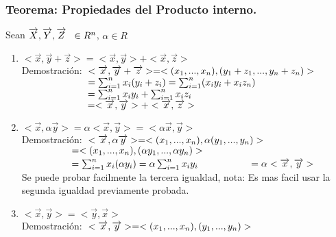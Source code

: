 \documentclass{book}
\begin{document}
\subsubsection*{Teorema: Propiedades del Producto interno.}
Sean $\overrightarrow{X},\overrightarrow{Y},\overrightarrow{Z}\hspace*{0.2cm}\in R^n$, $\alpha\in R$
\begin{enumerate}
    \item $<\overrightarrow{x},\overrightarrow{y}+\overrightarrow{z}>=<\overrightarrow{x},\overrightarrow{y}>+<\overrightarrow{x},\overrightarrow{z}>$
    \\Demostración:
    $\\<\overrightarrow{x},\overrightarrow{y}+\overrightarrow{z}>=<(x_{1},...,x_{n}),(y_{1}+z_{1},...,y_{n}+z_{n})>$
    $\\\hspace*{2.3cm}=\sum_{i=1}^{n}x_{i}(y_{i}+z_{i})=\sum_{i=1}^{n}(x_{i}y_{i}+x_{i}z_{n})$
    $\\\hspace*{2.3cm}=\sum_{i=1}^{n}x_{i}y_{i}+\sum_{i=1}^{n}x_{i}z_{i}$
    $\\\hspace*{2.3cm}=<\overrightarrow{x},\overrightarrow{y}>+<\overrightarrow{x},\overrightarrow{z}>$
    \item $<\overrightarrow{x},\alpha\overrightarrow{y}>=\alpha<\overrightarrow{x},\overrightarrow{y}>=<\alpha\overrightarrow{x},\overrightarrow{y}>$
    \\Demostración:
    $\\<\overrightarrow{x},\alpha\overrightarrow{y}>=<(x_{1},...,x_{n}),\alpha(y_{1},...,y_{n})>$
    $\\\hspace*{1.7cm}=<(x_{1},...,x_{n}),(\alpha y_{1},...,\alpha y_{n})>$
    $\\\hspace*{1.7cm}=\sum_{i=1}^{n}x_{i}(\alpha y_{i})=\alpha\sum_{i=1}^{n}x_{i} y_{i}$
    $\\\hspace*{1.7cm}=\alpha<\overrightarrow{x},\overrightarrow{y}>$
    \\Se puede probar facilmente la tercera igualdad, nota: Es mas facil usar la segunda igualdad previamente probada.
    \item $<\overrightarrow{x},\overrightarrow{y}>=<\overrightarrow{y},\overrightarrow{x}>$
    \\Demostración:
    $\\<\overrightarrow{x},\overrightarrow{y}>=<(x_{1},...,x_{n}),(y_{1},...,y_{n})>$

\end{enumerate}
\end{document}
